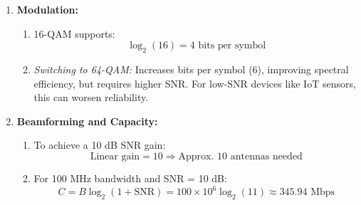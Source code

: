\documentclass[12pt]{article}
\begin{document}
\begin{enumerate}
\begin{enumerate}
        Where:
        \begin{itemize}
            \item \( P_{\text{rx}} = -121.42 \) dBm (minimum required received power to achieve SNR = 0 dB)
            \item \( G_{\text{tx}} = G_{\text{rx}} = 0 \) dBi (antenna gains)
            \item \( L_{\text{fs}} = 101.99 \) dB (free-space path loss)
            \item \( L_{\text{other}} = 8 \) dB (additional losses, e.g., wall attenuation, fading)
        \end{itemize}

        Substituting the values:

        \[
        P_{\text{tx}} = -121.42 + 101.99 + 8 = -11.43 \text{ dBm}
        \]

       To achieve an SNR of 0 dB at the receiver, the system must transmit at a minimum power of \(-11.43\) dBm.


        \item \textbf{Effect of Increasing Bandwidth to 1.4 MHz:} \\
        The new noise power is:
        \[
        P_n = -112.52 \text{ dBm}
        \]
        Compared to 180 kHz, the SNR decreases by:
        \[
        \Delta \text{SNR} = 8.91 \text{ dB}
        \]
        Increasing bandwidth increases noise, which reduces SNR.

    \end{enumerate}

    \item \textbf{Modulation:}
    \begin{enumerate}
        \item 16-QAM supports:
        \[
        \log_2(16) = 4 \text{ bits per symbol}
        \]

        \item \textit{Switching to 64-QAM:} Increases bits per symbol (6), improving spectral efficiency, but requires higher SNR. For low-SNR devices like IoT sensors, this can worsen reliability.
    \end{enumerate}

    \item \textbf{Beamforming and Capacity:}
    \begin{enumerate}
        \item To achieve a 10 dB SNR gain:
        \[
        \text{Linear gain} = 10 \Rightarrow \text{Approx. } 10 \text{ antennas needed}
        \]

        \item For 100 MHz bandwidth and SNR = 10 dB:
        \[
        C = B \log_2(1 + \text{SNR}) = 100 \times 10^6 \log_2(11) \approx 345.94 \text{ Mbps}
        \]
    \end{enumerate}
\end{enumerate}
\end{document}
